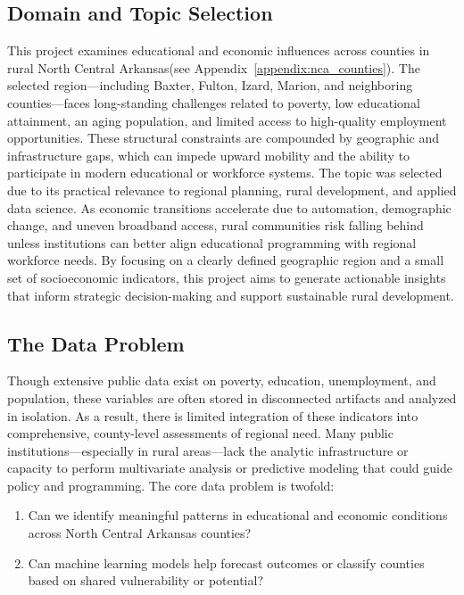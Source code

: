 \documentclass{llncs}
\begin{document}
\subsection{Domain and Topic Selection}\label{subsec:domain_topic}
This project examines educational and economic influences across counties in rural North Central Arkansas(see Appendix~\ref{appendix:nca_counties}). The selected region—including Baxter, Fulton, Izard, Marion, and neighboring counties—faces long-standing challenges related to poverty, low educational attainment, an aging population, and limited access to high-quality employment opportunities. These structural constraints are compounded by geographic and infrastructure gaps, which can impede upward mobility and the ability to participate in modern educational or workforce systems.
The topic was selected due to its practical relevance to regional planning, rural development, and applied data science. As economic transitions accelerate due to automation, demographic change, and uneven broadband access, rural communities risk falling behind unless institutions can better align educational programming with regional workforce needs\cite{corirural_2023}. By focusing on a clearly defined geographic region and a small set of socioeconomic indicators, this project aims to generate actionable insights that inform strategic decision-making and support sustainable rural development.

\subsection{The Data Problem}\label{subsec:data_prob}
Though extensive public data exist on poverty, education, unemployment, and population, these variables are often stored in disconnected artifacts and analyzed in isolation. As a result, there is limited integration of these indicators into comprehensive, county-level assessments of regional need. Many public institutions—especially in rural areas—lack the analytic infrastructure or capacity to perform multivariate analysis or predictive modeling that could guide policy and programming.
The core data problem is twofold:
\begin{enumerate}
    \item Can we identify meaningful patterns in educational and economic conditions across North Central Arkansas counties?
    \item Can machine learning models help forecast outcomes or classify counties based on shared vulnerability or potential?
\end{enumerate}
   
\end{document}
